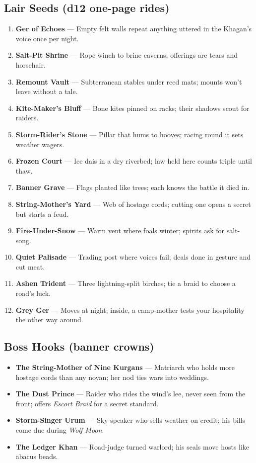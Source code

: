 \subsection*{Lair Seeds (d12 one-page rides)}
\begin{enumerate}
  \item \textbf{Ger of Echoes} — Empty felt walls repeat anything uttered in the Khagan’s voice once per night.
  \item \textbf{Salt-Pit Shrine} — Rope winch to brine caverns; offerings are tears and horsehair.
  \item \textbf{Remount Vault} — Subterranean stables under reed mats; mounts won’t leave without a tale.
  \item \textbf{Kite-Maker’s Bluff} — Bone kites pinned on racks; their shadows scout for raiders.
  \item \textbf{Storm-Rider’s Stone} — Pillar that hums to hooves; racing round it sets weather wagers.
  \item \textbf{Frozen Court} — Ice dais in a dry riverbed; law held here counts triple until thaw.
  \item \textbf{Banner Grave} — Flags planted like trees; each knows the battle it died in.
  \item \textbf{String-Mother’s Yard} — Web of hostage cords; cutting one opens a secret but starts a feud.
  \item \textbf{Fire-Under-Snow} — Warm vent where foals winter; spirits ask for salt-song.
  \item \textbf{Quiet Palisade} — Trading post where voices fail; deals done in gesture and cut meat.
  \item \textbf{Ashen Trident} — Three lightning-split birches; tie a braid to choose a road’s luck. 
  \item \textbf{Grey Ger} — Moves at night; inside, a camp-mother tests your hospitality the other way around.
\end{enumerate}

\subsection*{Boss Hooks (banner crowns)}
\begin{itemize}
  \item \textbf{The String-Mother of Nine Kurgans} — Matriarch who holds more hostage cords than any noyan; her nod ties wars into weddings.
  \item \textbf{The Dust Prince} — Raider who rides the wind’s lee, never seen from the front; offers \emph{Escort Braid} for a secret standard.
  \item \textbf{Storm-Singer Urum} — Sky-speaker who sells weather on credit; his bills come due during \emph{Wolf Moon}.
  \item \textbf{The Ledger Khan} — Road-judge turned warlord; his seals move hosts like abacus beads.
\end{itemize}

